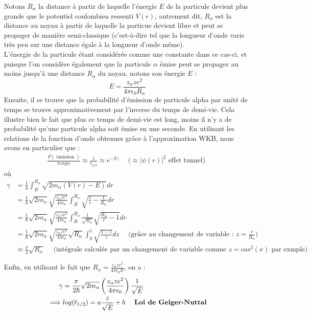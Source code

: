 Notons $R_{\alpha}$ la distance à partir de laquelle l'énergie $E$ de la particule devient plus grande que le potentiel coulombien ressenti $V(r)$, autrement dit, $R_{\alpha}$ est la distance au noyau à partir de laquelle la particue devient libre et peut se propager de manière semi-classique (c'est-à-dire tel que la longueur d'onde varie très peu sur une distance égale à la longueur d'onde même). \\
L'énergie de la particule étant considérée comme une constante dans ce cas-ci, et puisque l'on considère également que la particule $\alpha$ émise peut se propager au moins jusqu'à une distance $R_{\alpha}$ du noyau, notons son énergie $E$ : $$ E= \frac{z_{\alpha}z e^2}{4 \pi \epsilon_0 R_{\alpha}}$$ 
Ensuite, il se trouve que la probabilité d'émission de particule alpha par unité de temps se trouve approximativement par l'inverse du temps de demi-vie. Cela illustre bien le fait que plus ce temps de demi-vie est long, moins il n'y a de probabilité qu'une particule alpha soit émise en une seconde. En utilisant les relations de la fonction d'onde obtenues grâce à l'approximation WKB,
nous avons en particulier que : 
\begin{align}
  \frac{P( \mbox{ émission } )}{temps} \approx \frac{1}{t_{1/2}} \approx e^{-2 \gamma} \quad \mbox{ ($\approx \lvert \psi (r) \rvert ^2$ effet tunnel) } 
\end{align}
où  \begin{align*}
  \gamma &= \frac{1}{\hbar} \int_R^{R_{\alpha}} \sqrt{2 m_{\alpha} (V(r) - E)} dr \\
  &= \frac{1}{\hbar} \sqrt{2 m_{\alpha}} \sqrt{\frac{z_{\alpha} z e^2}{4 \pi \epsilon_0}} \int_R^{R_{\alpha}} \sqrt{\frac{1}{r} - \frac{1}{R_{\alpha}}} dr \\
  &= \frac{1}{\hbar} \sqrt{2 m_{\alpha}} \sqrt{\frac{z_{\alpha} z e^2}{4 \pi \epsilon_0}} \int_R^{R_{\alpha}} \frac{1}{\sqrt{R_{\alpha}}} \sqrt{\frac{R_{\alpha}}{r} - 1} dr \\
  &= \frac{1}{\hbar} \sqrt{2 m_{\alpha}} \sqrt{\frac{z_{\alpha} z e^2}{4 \pi \epsilon_0}} \sqrt{R_{\alpha}} \int_0^1 \sqrt{\frac{1-z}{z}} dz \quad \mbox{ (grâce au changement de variable : $z = \frac{r}{R_{\alpha}}$)} \\
  &\approx \frac{\pi}{2} \sqrt{R_{\alpha}} \quad \mbox{ (intégrale calculée par un changement de variable comme $z = cos^2(x)$ par exmple)} 
\end{align*}

Enfin, en utilisant le fait que $R_{\alpha} = \frac{z_{\alpha} z e^2}{4 \pi \epsilon_0 E}$, on a :
\begin{align}
\label{Loi de Geiger-Nuttal}
  \gamma &= \frac{\pi}{2 \hbar} \sqrt{2 m_{\alpha}} \left( \frac{z_{\alpha} z e^2}{4 \pi \epsilon_0} \right) \frac{1}{\sqrt{E}} \notag \\
  \implies & log(t_{1/2}) = a \frac{z}{\sqrt{E}} + b \quad \mbox{ \textbf{Loi de Geiger-Nuttal}} 
\end{align}

